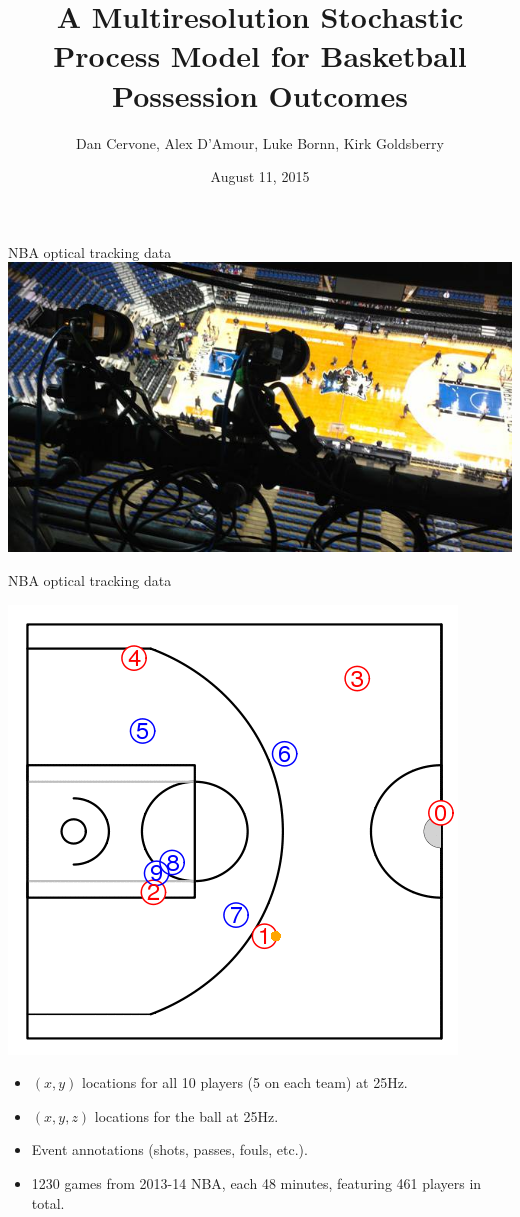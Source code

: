 \documentclass[10pt]{beamer}
\title[Multiresolution Basketball Modeling]{A Multiresolution Stochastic Process Model for Basketball Possession Outcomes}
\author[Dan Cervone]{Dan Cervone, Alex D'Amour, Luke Bornn, Kirk Goldsberry}
\institute[Harvard]{Harvard Statistics Department}
\date{August 11, 2015}
\begin{document}
\frame{\titlepage}

\begin{frame}{NBA optical tracking data}
\includegraphics[width=1.0\textwidth]{graphics/sporvu.jpg}
\end{frame}


\begin{frame}{NBA optical tracking data}
\begin{center}
\href{http://dcervone.com/wp-content/uploads/2015/01/nba_data.gif}{
\includegraphics[scale=0.25]
{nba_data_frame}}
\end{center}
\pause
\vspace{-0.3cm}
\begin{itemize}
\item $(x,y)$ locations for all 10 players (5 on each team) at 25Hz.
\item $(x,y,z)$ locations for the ball at 25Hz.
\item Event annotations (shots, passes, fouls, etc.).
\item 1230 games from 2013-14 NBA, each 48 minutes, featuring 461 players in total.
\end{itemize}
\end{frame}
\end{document}
